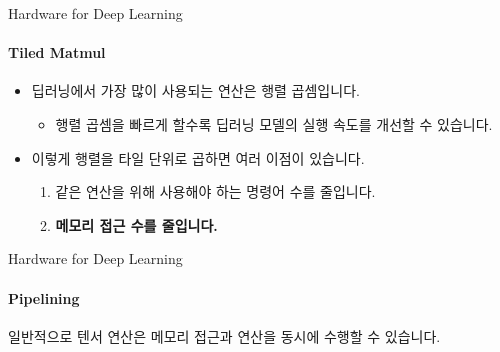 \begin{frame}{Hardware for Deep Learning}
\framesubtitle{Tiled Matmul}

\begin{itemize}
  \item 딥러닝에서 가장 많이 사용되는 연산은 행렬 곱셈입니다.
  \begin{itemize}
    \item 행렬 곱셈을 빠르게 할수록 딥러닝 모델의 실행 속도를 개선할 수 있습니다.
  \end{itemize}
  \item 이렇게 행렬을 타일 단위로 곱하면 여러 이점이 있습니다.
  \begin{enumerate}
    \item 같은 연산을 위해 사용해야 하는 명령어 수를 줄입니다.
    \pause
    \item \textbf{메모리 접근 수를 줄입니다.}
  \end{enumerate}
\end{itemize}
\pause
\begin{figure}
  \centering
\end{figure}
\end{frame}

\begin{frame}{Hardware for Deep Learning}
\framesubtitle{Pipelining}

일반적으로 텐서 연산은 메모리 접근과 연산을 동시에 수행할 수 있습니다.

\begin{figure}
  \centering
\end{figure}
\end{frame}

